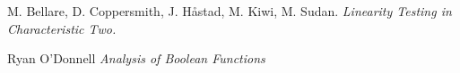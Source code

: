 \begin{comment}

Hypercontractivity:

Given the operator (T_p f)(x) = E(f(x_{1-p})), where each bit in x is flipped with probability 1-p. By Jensen's inequality, \| T_p f \|_p \leq \| f \_p. Hypercontractivity says that \| T_p f \|_2 \leq \| f \|_{1 + p^2} (so that T_p f flattens functions, which is intuitive).

Applications of Hypercontractivity:

KKL: (V1) There is c > 0 such that for all f: {-1,1}^n to {0,1}, Max I_i(f) >= c log(n) / n Var(f), and (V2) for all f: {-1,1}^n to {-1,1}, I(f) \geq c Var(f) \log(1/max I_i(f))

Poincare Inequality,

By taking a Fourier expansion, we find Var(f) \leq I(f) = \sum I_i(f).

The dictator is sharp for the Poincare inequality. The tribes function is sharp for KKL.

Strategy to prove KKL1 and KKL2:

If all influences are small, KKL V2. implies that the variance of f is small. Since I_k(f) = | Grad_k(f) |_1, Grad_k(f) is supported on a small set. Bu then by the Heisenberg uncertainty principle, the Fourier transform of the gradient must be spread out. This means most of the mass is spread out on high frequencies, so there is a large M such that

\sum_{0 < |s| < M} |\widehat{\nabla_f(s)}|^2 \ll I_k(f)

Thus

\sum_{0 < |s| < M} |s| |\widehat{\nabla_f(s)}|^2/4  = \sum_k \sum_{0 < |s| < M} |\widehat{\nabla_f(s)}|^2 \ll I(f)

Case 1: \sum |\widehat{f}(s)|^2 \geq \var(f)/2

\chapter{Percolation}

\end{comment}

\begin{thebibliography}{9}

M. Bellare, D. Coppersmith, J. H\r{a}stad, M. Kiwi, M. Sudan.
\textit{Linearity Testing in Characteristic Two.}

Ryan O'Donnell
\textit{Analysis of Boolean Functions}

\end{thebibliography}

